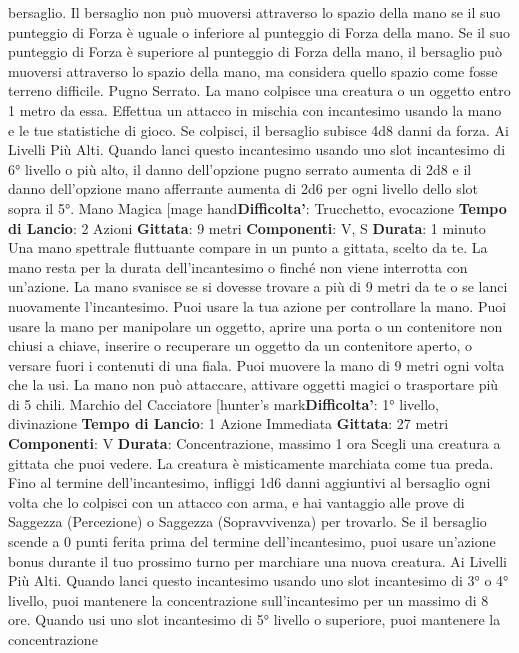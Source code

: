 \begin{multicols}{2}
bersaglio. Il bersaglio non può muoversi attraverso lo
spazio della mano se il suo punteggio di Forza è uguale
o inferiore al punteggio di Forza della mano. Se il suo
punteggio di Forza è superiore al punteggio di Forza
della mano, il bersaglio può muoversi attraverso lo
spazio della mano, ma considera quello spazio come
fosse terreno difficile.
Pugno Serrato. La mano colpisce una creatura o un
oggetto entro 1 metro da essa. Effettua un attacco in
mischia con incantesimo usando la mano e le tue
statistiche di gioco. Se colpisci, il bersaglio subisce 4d8
danni da forza.
Ai Livelli Più Alti. Quando lanci questo incantesimo
usando uno slot incantesimo di 6° livello o più alto, il
danno dell’opzione pugno serrato aumenta di 2d8 e il
danno dell’opzione mano afferrante aumenta di 2d6 per
ogni livello dello slot sopra il 5°.
Mano Magica
[mage hand\textbf{Difficolta'}:
Trucchetto, evocazione
\textbf{Tempo di Lancio}: 2 Azioni
\textbf{Gittata}: 9 metri
\textbf{Componenti}: V, S
\textbf{Durata}: 1 minuto
Una mano spettrale fluttuante compare in un punto a
gittata, scelto da te. La mano resta per la durata
dell’incantesimo o finché non viene interrotta con
un’azione. La mano svanisce se si dovesse trovare a
più di 9 metri da te o se lanci nuovamente
l’incantesimo.
Puoi usare la tua azione per controllare la mano. Puoi
usare la mano per manipolare un oggetto, aprire una
porta o un contenitore non chiusi a chiave, inserire o
recuperare un oggetto da un contenitore aperto, o
versare fuori i contenuti di una fiala. Puoi muovere la
mano di 9 metri ogni volta che la usi.
La mano non può attaccare, attivare oggetti magici o
trasportare più di 5 chili.
Marchio del Cacciatore
[hunter’s mark\textbf{Difficolta'}:
1° livello, divinazione
\textbf{Tempo di Lancio}: 1 Azione Immediata
\textbf{Gittata}: 27 metri
\textbf{Componenti}: V
\textbf{Durata}: Concentrazione, massimo 1 ora
Scegli una creatura a gittata che puoi vedere. La
creatura è misticamente marchiata come tua preda.
Fino al termine dell’incantesimo, infliggi 1d6 danni
aggiuntivi al bersaglio ogni volta che lo colpisci con un
attacco con arma, e hai vantaggio alle prove di
Saggezza (Percezione) o Saggezza (Sopravvivenza)
per trovarlo. Se il bersaglio scende a 0 punti ferita prima
del termine dell’incantesimo, puoi usare un’azione
bonus durante il tuo prossimo turno per marchiare una
nuova creatura.
Ai Livelli Più Alti. Quando lanci questo incantesimo
usando uno slot incantesimo di 3° o 4° livello, puoi
mantenere la concentrazione sull’incantesimo per un
massimo di 8 ore. Quando usi uno slot incantesimo di
5° livello o superiore, puoi mantenere la concentrazione

\end{multicols}
